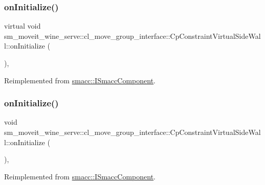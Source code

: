 \subsubsection{\texorpdfstring{on\+Initialize()}{onInitialize()}\hspace{0.1cm}{\footnotesize\ttfamily [1/2]}}
{\footnotesize\ttfamily virtual void sm\+\_\+moveit\+\_\+wine\+\_\+serve\+::cl\+\_\+move\+\_\+group\+\_\+interface\+::\+Cp\+Constraint\+Virtual\+Side\+Wall\+::on\+Initialize (\begin{DoxyParamCaption}{ }\end{DoxyParamCaption})\hspace{0.3cm}{\ttfamily [override]}, {\ttfamily [virtual]}}



Reimplemented from \hyperlink{classsmacc_1_1ISmaccComponent_ae6f71d008db12553912e9436184b9e65}{smacc\+::\+I\+Smacc\+Component}.

\mbox{\label{classsm__moveit__wine__serve_1_1cl__move__group__interface_1_1CpConstraintVirtualSideWall_a834e3d1e6b683cbacfaafc40847df9fa}} 
\subsubsection{\texorpdfstring{on\+Initialize()}{onInitialize()}\hspace{0.1cm}{\footnotesize\ttfamily [2/2]}}
{\footnotesize\ttfamily void sm\+\_\+moveit\+\_\+wine\+\_\+serve\+::cl\+\_\+move\+\_\+group\+\_\+interface\+::\+Cp\+Constraint\+Virtual\+Side\+Wall\+::on\+Initialize (\begin{DoxyParamCaption}{ }\end{DoxyParamCaption})\hspace{0.3cm}{\ttfamily [override]}, {\ttfamily [virtual]}}



Reimplemented from \hyperlink{classsmacc_1_1ISmaccComponent_ae6f71d008db12553912e9436184b9e65}{smacc\+::\+I\+Smacc\+Component}.



